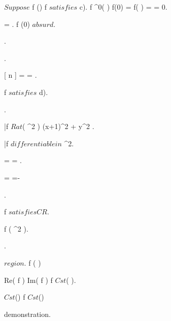 \documentclass[../Main/main]{subfiles}
\begin{document}
{{{			
			{
				$ Suppose $ \exists \; f \in \Hc(\D) \suchthat f $ satisfies $ c).
				f \in \Cc^0( \D ) \imp f(0) = f(  ) =  = 0.

				 =  \nin \C.
				f \nin \Hc(0) $ absurd $.
			}.

			{
				.

				{
					 =  = 
				}.

				f $ satisfies $ d).


				.

				\bar{f} \in $ Rat$( \R^2 ) \logicAnd {}
				{
					(x+1)^2 + y^2 
				}.

				\bar{f} $ differentiable in $ \R^2.

				{
					 =  = .

					 = =-
				}.				

				f $ satisfies CR $.

				\conclude f \in \Hc( \R^2 ).

			}.
		}
	}


	{
		{
			\Omega \subset \C $ region $.
			f \in \Hc( \Omega )
		}
		\holds
		{
			Re( f )  \logicOr Im( f )  \imp f \in $ Cst$( \C ).

			 \in $ Cst$(\C) \imp f \in $ Cst$(\C)

		}
		\demonstration
		{
			demonstration.
		}
	}
	
	
	
}
\end{document}
